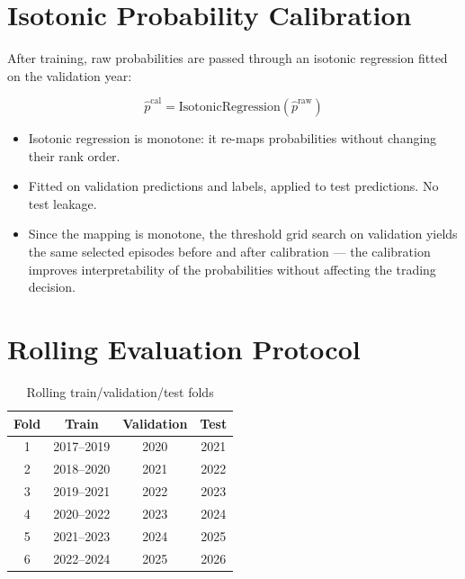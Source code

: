\documentclass[11pt]{article}
\newcommand{\1}{\mathbf{1}}
\begin{document}
\section{Isotonic Probability Calibration}

After training, raw probabilities are passed through an isotonic regression
fitted on the validation year:

\[
  \hat{p}^{\mathrm{cal}} = \mathrm{IsotonicRegression}(\hat{p}^{\mathrm{raw}})
\]

\begin{itemize}[leftmargin=*]
  \item Isotonic regression is monotone: it re-maps probabilities without
        changing their rank order.
  \item Fitted on validation predictions and labels, applied to test
        predictions. No test leakage.
  \item Since the mapping is monotone, the threshold grid search on validation
        yields the same selected episodes before and after calibration --- the
        calibration improves interpretability of the probabilities without
        affecting the trading decision.
\end{itemize}

\section{Rolling Evaluation Protocol}

\begin{table}[h]
\centering
\caption{Rolling train/validation/test folds}
\begin{tabular}{cccc}
\toprule
Fold & Train & Validation & Test \\
\midrule
1 & 2017--2019 & 2020 & 2021 \\
2 & 2018--2020 & 2021 & 2022 \\
3 & 2019--2021 & 2022 & 2023 \\
4 & 2020--2022 & 2023 & 2024 \\
5 & 2021--2023 & 2024 & 2025 \\
6 & 2022--2024 & 2025 & 2026 \\
\bottomrule
\end{tabular}
\end{table}
\end{document}
